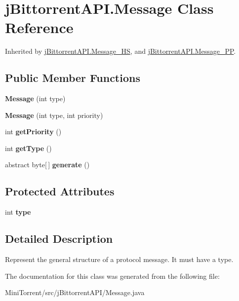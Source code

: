 \hypertarget{classj_bittorrent_a_p_i_1_1_message}{
\section{jBittorrentAPI.Message Class Reference}
\label{classj_bittorrent_a_p_i_1_1_message}
}


Inherited by \hyperlink{classj_bittorrent_a_p_i_1_1_message___h_s}{jBittorrentAPI.Message\_\-HS}, and \hyperlink{classj_bittorrent_a_p_i_1_1_message___p_p}{jBittorrentAPI.Message\_\-PP}.\subsection*{Public Member Functions}
\begin{DoxyCompactItemize}
\item 
\hypertarget{classj_bittorrent_a_p_i_1_1_message_afa9bbeac6c8d4976fc0b120c24c454e9}{
{\bfseries Message} (int type)}
\label{classj_bittorrent_a_p_i_1_1_message_afa9bbeac6c8d4976fc0b120c24c454e9}

\item 
\hypertarget{classj_bittorrent_a_p_i_1_1_message_a0c3719a9a65f29360426ffdf84a2dd3e}{
{\bfseries Message} (int type, int priority)}
\label{classj_bittorrent_a_p_i_1_1_message_a0c3719a9a65f29360426ffdf84a2dd3e}

\item 
\hypertarget{classj_bittorrent_a_p_i_1_1_message_a55cac0527629a924bbbd73e7571a376b}{
int {\bfseries getPriority} ()}
\label{classj_bittorrent_a_p_i_1_1_message_a55cac0527629a924bbbd73e7571a376b}

\item 
\hypertarget{classj_bittorrent_a_p_i_1_1_message_aa5215fa01309d8fb562f2b3f294e158b}{
int {\bfseries getType} ()}
\label{classj_bittorrent_a_p_i_1_1_message_aa5215fa01309d8fb562f2b3f294e158b}

\item 
\hypertarget{classj_bittorrent_a_p_i_1_1_message_a0cabcff4c59213bd50bbd0ef4fb845a4}{
abstract byte\mbox{[}$\,$\mbox{]} {\bfseries generate} ()}
\label{classj_bittorrent_a_p_i_1_1_message_a0cabcff4c59213bd50bbd0ef4fb845a4}

\end{DoxyCompactItemize}
\subsection*{Protected Attributes}
\begin{DoxyCompactItemize}
\item 
\hypertarget{classj_bittorrent_a_p_i_1_1_message_a381c2cad2b64b66af4a14eb60ebe95d0}{
int {\bfseries type}}
\label{classj_bittorrent_a_p_i_1_1_message_a381c2cad2b64b66af4a14eb60ebe95d0}

\end{DoxyCompactItemize}


\subsection{Detailed Description}
Represent the general structure of a protocol message. It must have a type. 

The documentation for this class was generated from the following file:\begin{DoxyCompactItemize}
\item 
MiniTorrent/src/jBittorrentAPI/Message.java\end{DoxyCompactItemize}
